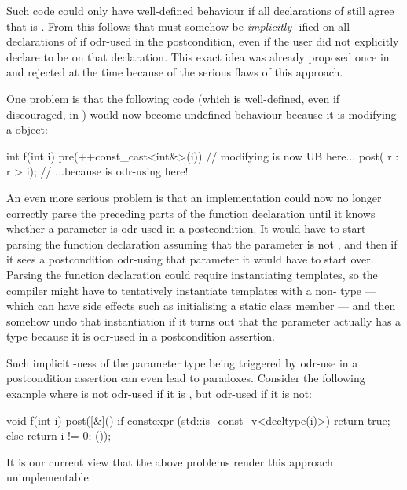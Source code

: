 Such code could only have well-defined behaviour if all declarations of  still agree that  is . From this follows that  must somehow be \emph{implicitly} -ified on all declarations of  if odr-used in the postcondition, even if the user did not explicitly declare  to be  on that declaration. This exact idea was already proposed once in \cite{P2829R0} and rejected at the time because of the serious flaws of this approach.

One problem is that the following code (which is well-defined, even if discouraged, in \cite{P2900R10}) would now become undefined behaviour because it is modifying a  object:

\begin{codeblock}
int f(int i) 
  pre(++const_cast<int&>(i))  // modifying  is now UB here...
  post( r : r > i);  // ...because  is odr-using  here!
\end{codeblock}

An even more serious problem is that an implementation could now no longer correctly parse the preceding parts of the function declaration until it knows whether a parameter is odr-used in a postcondition. It would have to start parsing the function declaration assuming that the parameter is not , and then if it sees a postcondition odr-using that parameter it would have to start over. Parsing the function declaration could require instantiating templates, so the compiler might have to tentatively instantiate templates with a non- type --- which can have side effects such as initialising a static class member --- and then somehow undo that instantiation if it turns out that the parameter actually has a  type because it is odr-used in a postcondition assertion.

Such implicit -ness of the parameter type being triggered by odr-use in a postcondition assertion can even lead to paradoxes. Consider the following example where  is not odr-used if it is , but odr-used if it is not:
\begin{codeblock}
void f(int i)
  post([&]() {
    if constexpr (std::is_const_v<decltype(i)>) {
      return true; 
    } else {
      return i != 0;
    }
  }());
\end{codeblock}

It is our current view that the above problems render this approach unimplementable. 



